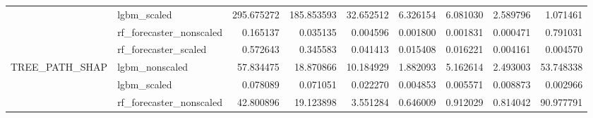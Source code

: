 \begin{tabular}{llrrrrrrr}
 & lgbm\_scaled & {\cellcolor[HTML]{B40426}} \color[HTML]{F1F1F1} 295.675272 & {\cellcolor[HTML]{F5C4AC}} \color[HTML]{000000} 185.853593 & {\cellcolor[HTML]{5B7AE5}} \color[HTML]{F1F1F1} 32.652512 & {\cellcolor[HTML]{3F53C6}} \color[HTML]{F1F1F1} 6.326154 & {\cellcolor[HTML]{3F53C6}} \color[HTML]{F1F1F1} 6.081030 & {\cellcolor[HTML]{3C4EC2}} \color[HTML]{F1F1F1} 2.589796 & {\cellcolor[HTML]{3B4CC0}} \color[HTML]{F1F1F1} 1.071461 \\
 & rf\_forecaster\_nonscaled & {\cellcolor[HTML]{7EA1FA}} \color[HTML]{F1F1F1} 0.165137 & {\cellcolor[HTML]{485FD1}} \color[HTML]{F1F1F1} 0.035135 & {\cellcolor[HTML]{3C4EC2}} \color[HTML]{F1F1F1} 0.004596 & {\cellcolor[HTML]{3B4CC0}} \color[HTML]{F1F1F1} 0.001800 & {\cellcolor[HTML]{3B4CC0}} \color[HTML]{F1F1F1} 0.001831 & {\cellcolor[HTML]{3B4CC0}} \color[HTML]{F1F1F1} 0.000471 & {\cellcolor[HTML]{B40426}} \color[HTML]{F1F1F1} 0.791031 \\
 & rf\_forecaster\_scaled & {\cellcolor[HTML]{B40426}} \color[HTML]{F1F1F1} 0.572643 & {\cellcolor[HTML]{F2CBB7}} \color[HTML]{000000} 0.345583 & {\cellcolor[HTML]{4E68D8}} \color[HTML]{F1F1F1} 0.041413 & {\cellcolor[HTML]{4055C8}} \color[HTML]{F1F1F1} 0.015408 & {\cellcolor[HTML]{4055C8}} \color[HTML]{F1F1F1} 0.016221 & {\cellcolor[HTML]{3B4CC0}} \color[HTML]{F1F1F1} 0.004161 & {\cellcolor[HTML]{3B4CC0}} \color[HTML]{F1F1F1} 0.004570 \\
\multirow[c]{4}{*}{TREE\_PATH\_SHAP} & lgbm\_nonscaled & {\cellcolor[HTML]{B40426}} \color[HTML]{F1F1F1} 57.834475 & {\cellcolor[HTML]{9FBFFF}} \color[HTML]{000000} 18.870866 & {\cellcolor[HTML]{688AEF}} \color[HTML]{F1F1F1} 10.184929 & {\cellcolor[HTML]{3B4CC0}} \color[HTML]{F1F1F1} 1.882093 & {\cellcolor[HTML]{4C66D6}} \color[HTML]{F1F1F1} 5.162614 & {\cellcolor[HTML]{3D50C3}} \color[HTML]{F1F1F1} 2.493003 & {\cellcolor[HTML]{CD423B}} \color[HTML]{F1F1F1} 53.748338 \\
 & lgbm\_scaled & {\cellcolor[HTML]{B40426}} \color[HTML]{F1F1F1} 0.078089 & {\cellcolor[HTML]{D44E41}} \color[HTML]{F1F1F1} 0.071051 & {\cellcolor[HTML]{8FB1FE}} \color[HTML]{000000} 0.022270 & {\cellcolor[HTML]{4257C9}} \color[HTML]{F1F1F1} 0.004853 & {\cellcolor[HTML]{445ACC}} \color[HTML]{F1F1F1} 0.005571 & {\cellcolor[HTML]{536EDD}} \color[HTML]{F1F1F1} 0.008873 & {\cellcolor[HTML]{3B4CC0}} \color[HTML]{F1F1F1} 0.002966 \\
 & rf\_forecaster\_nonscaled & {\cellcolor[HTML]{D4DBE6}} \color[HTML]{000000} 42.800896 & {\cellcolor[HTML]{7DA0F9}} \color[HTML]{F1F1F1} 19.123898 & {\cellcolor[HTML]{445ACC}} \color[HTML]{F1F1F1} 3.551284 & {\cellcolor[HTML]{3B4CC0}} \color[HTML]{F1F1F1} 0.646009 & {\cellcolor[HTML]{3B4CC0}} \color[HTML]{F1F1F1} 0.912029 & {\cellcolor[HTML]{3B4CC0}} \color[HTML]{F1F1F1} 0.814042 & {\cellcolor[HTML]{B40426}} \color[HTML]{F1F1F1} 90.977791 \\

\end{tabular}
